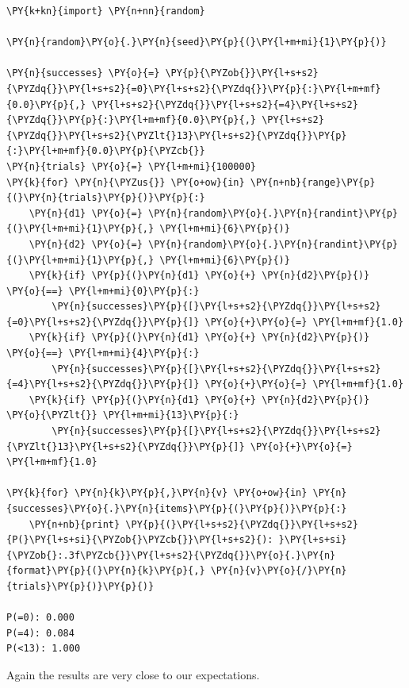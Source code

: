 \begin{tcolorbox}[breakable, size=fbox, boxrule=1pt, pad at break*=1mm,colback=cellbackground, colframe=cellborder]
\begin{Verbatim}[commandchars=\\\{\}]
\PY{k+kn}{import} \PY{n+nn}{random}

\PY{n}{random}\PY{o}{.}\PY{n}{seed}\PY{p}{(}\PY{l+m+mi}{1}\PY{p}{)}

\PY{n}{successes} \PY{o}{=} \PY{p}{\PYZob{}}\PY{l+s+s2}{\PYZdq{}}\PY{l+s+s2}{=0}\PY{l+s+s2}{\PYZdq{}}\PY{p}{:}\PY{l+m+mf}{0.0}\PY{p}{,} \PY{l+s+s2}{\PYZdq{}}\PY{l+s+s2}{=4}\PY{l+s+s2}{\PYZdq{}}\PY{p}{:}\PY{l+m+mf}{0.0}\PY{p}{,} \PY{l+s+s2}{\PYZdq{}}\PY{l+s+s2}{\PYZlt{}13}\PY{l+s+s2}{\PYZdq{}}\PY{p}{:}\PY{l+m+mf}{0.0}\PY{p}{\PYZcb{}}
\PY{n}{trials} \PY{o}{=} \PY{l+m+mi}{100000}
\PY{k}{for} \PY{n}{\PYZus{}} \PY{o+ow}{in} \PY{n+nb}{range}\PY{p}{(}\PY{n}{trials}\PY{p}{)}\PY{p}{:}
    \PY{n}{d1} \PY{o}{=} \PY{n}{random}\PY{o}{.}\PY{n}{randint}\PY{p}{(}\PY{l+m+mi}{1}\PY{p}{,} \PY{l+m+mi}{6}\PY{p}{)}
    \PY{n}{d2} \PY{o}{=} \PY{n}{random}\PY{o}{.}\PY{n}{randint}\PY{p}{(}\PY{l+m+mi}{1}\PY{p}{,} \PY{l+m+mi}{6}\PY{p}{)}
    \PY{k}{if} \PY{p}{(}\PY{n}{d1} \PY{o}{+} \PY{n}{d2}\PY{p}{)} \PY{o}{==} \PY{l+m+mi}{0}\PY{p}{:}
        \PY{n}{successes}\PY{p}{[}\PY{l+s+s2}{\PYZdq{}}\PY{l+s+s2}{=0}\PY{l+s+s2}{\PYZdq{}}\PY{p}{]} \PY{o}{+}\PY{o}{=} \PY{l+m+mf}{1.0}
    \PY{k}{if} \PY{p}{(}\PY{n}{d1} \PY{o}{+} \PY{n}{d2}\PY{p}{)} \PY{o}{==} \PY{l+m+mi}{4}\PY{p}{:}
        \PY{n}{successes}\PY{p}{[}\PY{l+s+s2}{\PYZdq{}}\PY{l+s+s2}{=4}\PY{l+s+s2}{\PYZdq{}}\PY{p}{]} \PY{o}{+}\PY{o}{=} \PY{l+m+mf}{1.0}
    \PY{k}{if} \PY{p}{(}\PY{n}{d1} \PY{o}{+} \PY{n}{d2}\PY{p}{)} \PY{o}{\PYZlt{}} \PY{l+m+mi}{13}\PY{p}{:}
        \PY{n}{successes}\PY{p}{[}\PY{l+s+s2}{\PYZdq{}}\PY{l+s+s2}{\PYZlt{}13}\PY{l+s+s2}{\PYZdq{}}\PY{p}{]} \PY{o}{+}\PY{o}{=} \PY{l+m+mf}{1.0}
    
\PY{k}{for} \PY{n}{k}\PY{p}{,}\PY{n}{v} \PY{o+ow}{in} \PY{n}{successes}\PY{o}{.}\PY{n}{items}\PY{p}{(}\PY{p}{)}\PY{p}{:}
    \PY{n+nb}{print} \PY{p}{(}\PY{l+s+s2}{\PYZdq{}}\PY{l+s+s2}{P(}\PY{l+s+si}{\PYZob{}\PYZcb{}}\PY{l+s+s2}{): }\PY{l+s+si}{\PYZob{}:.3f\PYZcb{}}\PY{l+s+s2}{\PYZdq{}}\PY{o}{.}\PY{n}{format}\PY{p}{(}\PY{n}{k}\PY{p}{,} \PY{n}{v}\PY{o}{/}\PY{n}{trials}\PY{p}{)}\PY{p}{)}

P(=0): 0.000
P(=4): 0.084
P(<13): 1.000
\end{Verbatim}
\end{tcolorbox}

Again the results are very close to our expectations.

